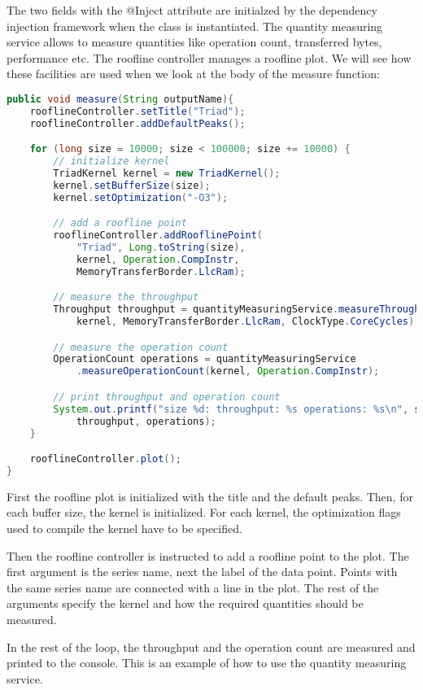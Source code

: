 \documentclass[a4paper,12pt]{article}
\begin{document}
The two fields with the @Inject attribute are initialzed by the dependency
injection framework when the class is instantiated. The quantity measuring
service allows to measure quantities like operation count, transferred bytes,
performance etc. The roofline controller manages a roofline plot. We will see
how these facilities are used when we look at the body of the measure function:

\begin{lstlisting}[language=JAVA]
public void measure(String outputName){
	rooflineController.setTitle("Triad");
	rooflineController.addDefaultPeaks();

	for (long size = 10000; size < 100000; size += 10000) {
		// initialize kernel
		TriadKernel kernel = new TriadKernel();
		kernel.setBufferSize(size);
		kernel.setOptimization("-O3");

		// add a roofline point
		rooflineController.addRooflinePoint(
			"Triad", Long.toString(size),
			kernel, Operation.CompInstr,
			MemoryTransferBorder.LlcRam);

		// measure the throughput
		Throughput throughput = quantityMeasuringService.measureThroughput(
			kernel, MemoryTransferBorder.LlcRam, ClockType.CoreCycles);

		// measure the operation count
		OperationCount operations = quantityMeasuringService
			.measureOperationCount(kernel, Operation.CompInstr);

		// print throughput and operation count
		System.out.printf("size %d: throughput: %s operations: %s\n", size,
			throughput, operations);
	}

	rooflineController.plot();
}
\end{lstlisting}

First the roofline plot is initialized with the title and the default peaks.
Then, for each buffer size, the kernel is initialized. For each kernel, the
optimization flags used to compile the kernel have to be specified.

Then the roofline controller is instructed to add a roofline point to the plot.
The first argument is the series name, next the label of the data point. Points
with the same series name are connected with a line in the plot. The rest of the
arguments specify the kernel and how the required quantities should be measured.

In the rest of the loop, the throughput and the operation count are measured and
printed to the console. This is an example of how to use the quantity measuring
service.
\end{document}
